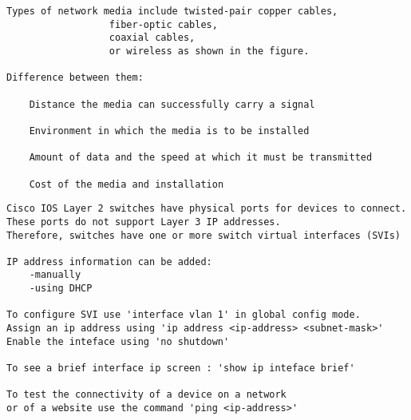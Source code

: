 \documentclass[../EngineeringJournal_CDavis.tex]{subfiles}
\begin{document}
\hspace{0.2cm}
\begin{tcolorbox}[width=6.3in]
\scriptsize 
\begin{verbatim}
Types of network media include twisted-pair copper cables, 
			      fiber-optic cables, 
			      coaxial cables, 
			      or wireless as shown in the figure. 

Difference between them:

    Distance the media can successfully carry a signal

    Environment in which the media is to be installed

    Amount of data and the speed at which it must be transmitted

    Cost of the media and installation
\end{verbatim}
\end{tcolorbox}
\hspace{0.2cm}
\normalsize  

\hspace{0.2cm}
\begin{tcolorbox}[width=6.3in]
\scriptsize 
\begin{verbatim}
Cisco IOS Layer 2 switches have physical ports for devices to connect. 
These ports do not support Layer 3 IP addresses. 
Therefore, switches have one or more switch virtual interfaces (SVIs)

IP address information can be added:
	-manually
	-using DHCP

To configure SVI use 'interface vlan 1' in global config mode.
Assign an ip address using 'ip address <ip-address> <subnet-mask>'
Enable the inteface using 'no shutdown'

To see a brief interface ip screen : 'show ip inteface brief'

To test the connectivity of a device on a network 
or of a website use the command 'ping <ip-address>'

\end{verbatim}
\end{tcolorbox}
\hspace{0.2cm}
\normalsize  

\newpage

\end{document}
